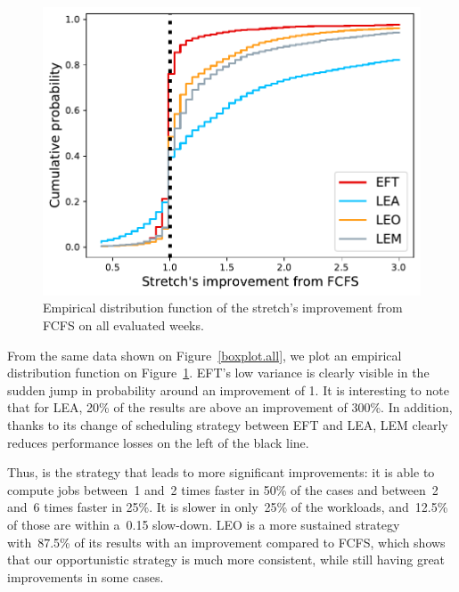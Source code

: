 \documentclass[sigconf,review,anonymous]{acmart}
\newcommand{\rev}[1]{{\color{blue}{#1}}}
\begin{document}
\begin{figure}[t]\centering\includegraphics[width=0.9\linewidth]{../MBSS/plot/ECDF/byuser/ecdf_stretch_all-all.pdf}\caption{Empirical distribution function of the stretch's improvement from FCFS on all evaluated weeks.}\label{ecdf}\end{figure}
From the same data shown on Figure~\ref{boxplot.all}, we plot an empirical distribution function on Figure~\ref{ecdf}.
EFT's low variance is clearly visible in the sudden jump in probability around an improvement of 1.
It is interesting to note that for LEA, 20\% of the results are above an improvement of 300\%.
In addition, thanks to its change of scheduling strategy between EFT and LEA, LEM clearly reduces
performance losses on the left of the black line.

Thus, \rev{LEA} is the strategy that leads to more significant improvements: it is able to compute jobs between~1 and~2 times faster in 50\% of the cases and between~2 and~6 times faster in 25\%.
It is slower in only~25\% of the workloads, and~12.5\% of those are within a~0.15 slow-down.
LEO is a more sustained strategy with~87.5\% of its results with an improvement compared to FCFS, which shows that our opportunistic
strategy is much more consistent, while still having great improvements in some cases.
\rev{LEM is more versatile. It leads to an improvement in ~87.5\% of the results, with a speed-up of at least 7.5\% in 50\% of the results.}
\end{document}
